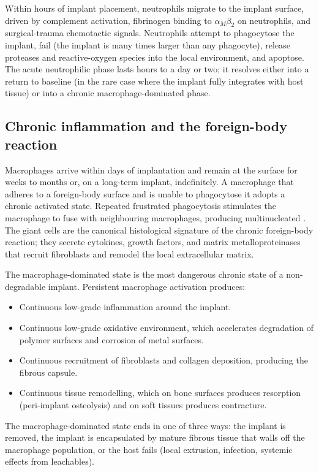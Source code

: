 Within hours of implant placement, neutrophils migrate to the
implant surface, driven by complement activation, fibrinogen
binding to $\alpha_M\beta_2$ on neutrophils, and surgical-trauma
chemotactic signals. Neutrophils attempt to phagocytose the implant,
fail (the implant is many times larger than any phagocyte), release
proteases and reactive-oxygen species into the local environment,
and apoptose. The acute neutrophilic phase lasts hours to a day
or two; it resolves either into a return to baseline (in the rare
case where the implant fully integrates with host tissue) or into
a chronic macrophage-dominated phase.

\subsection{Chronic inflammation and the foreign-body reaction}

Macrophages arrive within days of implantation and remain at the
surface for weeks to months or, on a long-term implant,
indefinitely. A macrophage that adheres to a foreign-body surface
and is unable to phagocytose it adopts a chronic activated state.
Repeated frustrated phagocytosis stimulates the macrophage to fuse
with neighbouring macrophages, producing multinucleated
. The giant cells are the
canonical histological signature of the chronic foreign-body
reaction; they secrete cytokines, growth factors, and matrix
metalloproteinases that recruit fibroblasts and remodel the local
extracellular matrix.

The macrophage-dominated state is the most dangerous chronic state
of a non-degradable implant. Persistent macrophage activation
produces:

\begin{itemize}[leftmargin=*]
\item Continuous low-grade inflammation around the implant.
\item Continuous low-grade oxidative environment, which accelerates
  degradation of polymer surfaces and corrosion of metal surfaces.
\item Continuous recruitment of fibroblasts and collagen deposition,
  producing the fibrous capsule.
\item Continuous tissue remodelling, which on bone surfaces
  produces resorption (peri-implant osteolysis) and on soft tissues
  produces contracture.
\end{itemize}

The macrophage-dominated state ends in one of three ways: the
implant is removed, the implant is encapsulated by mature fibrous
tissue that walls off the macrophage population, or the host fails
(local extrusion, infection, systemic effects from leachables).

